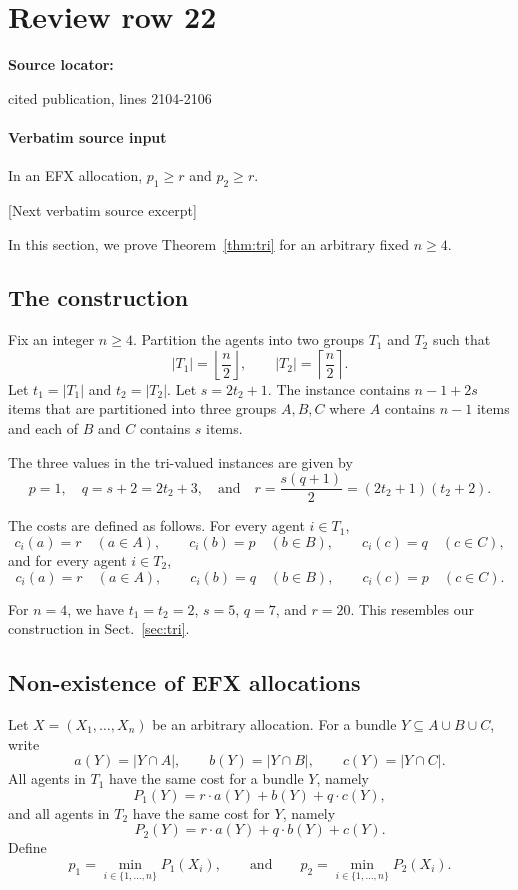 \documentclass[10pt]{article}
\begin{document}
\section*{Review row 22}
\textbf{Source locator:} {\footnotesize\raggedright cited publication, lines 2104-\allowbreak{}2106\par}
\paragraph{Verbatim source input}
\begin{ReviewVerbatim}
\begin{proposition}
    In an EFX allocation, $p_1\ge r$ and $p_2\ge r$.
\end{proposition}

[Next verbatim source excerpt]

In this section, we prove Theorem~\ref{thm:tri} for an arbitrary fixed $n\geq 4$.

\subsection{The construction}
Fix an integer $n\ge 4$. Partition the agents into two groups $T_1$ and $T_2$ such that
\[
    |T_1|=\left\lfloor \frac n2\right\rfloor,
    \qquad
    |T_2|=\left\lceil \frac n2\right\rceil.
\]
Let $t_1=|T_1|$ and $t_2=|T_2|$.
Let $s=2t_2+1$.
The instance contains $n-1+2s$ items that are partitioned into three groups $A,B,C$ where $A$ contains $n-1$ items and each of $B$ and $C$ contains $s$ items.

The three values in the tri-valued instances are given by
$$p=1,\quad q=s+2=2t_2+3,\quad\mbox{and}\quad r=\frac{s(q+1)}2=(2t_2+1)(t_2+2).$$


The costs are defined as follows. For every agent $i\in T_1$,
\[
    c_i(a)=r \quad(a\in A),
    \qquad
    c_i(b)=p \quad(b\in B),
    \qquad
    c_i(c)=q \quad(c\in C),
\]
and for every agent $i\in T_2$,
\[
    c_i(a)=r \quad(a\in A),
    \qquad
    c_i(b)=q \quad(b\in B),
    \qquad
    c_i(c)=p \quad(c\in C).
\]

For $n=4$, we have $t_1=t_2=2$, $s=5$, $q=7$, and $r=20$.
This resembles our construction in Sect.~\ref{sec:tri}.

\subsection{Non-existence of EFX allocations}
Let $X=(X_1,\ldots,X_n)$ be an arbitrary allocation. For a bundle $Y\subseteq A\cup B\cup C$, write
\[
    a(Y)=|Y\cap A|,
    \qquad
    b(Y)=|Y\cap B|,
    \qquad
    c(Y)=|Y\cap C|.
\]
All agents in $T_1$ have the same cost for a bundle $Y$, namely
\[
    P_1(Y)=r\cdot a(Y)+b(Y)+q\cdot c(Y),
\]
and all agents in $T_2$ have the same cost for $Y$, namely
\[
    P_2(Y)=r\cdot  a(Y)+q\cdot b(Y)+c(Y).
\]
Define
\[
    p_1=\min_{i\in \{1,\ldots,n\}} P_1(X_i),
    \qquad\mbox{and}\qquad
    p_2=\min_{i\in \{1,\ldots,n\}} P_2(X_i).
\]
\end{ReviewVerbatim}
\end{document}
